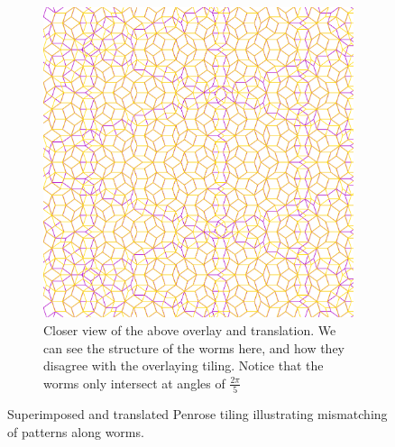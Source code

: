 \documentclass[
  oneside,
  11pt, a4paper,
  footinclude=true,
  headinclude=true,
  cleardoublepage=empty
]{scrbook}
\begin{document}
\begin{figure}[H]
\begin{subfigure}{0.6\textwidth}
\includegraphics[width=\textwidth]{reTranslateClose}
\caption{Closer view of the above overlay and translation. We can see the structure of the worms here, and how they disagree with the overlaying tiling. Notice that the worms only intersect at angles of $\frac{2\pi}{5}$}
\label{fig:close}
\end{subfigure}
\caption[Translated Tilings Mismatch on Worms]{Superimposed and translated Penrose tiling illustrating mismatching of patterns along worms.}
\label{fig:translations}
\end{figure}
\end{document}
